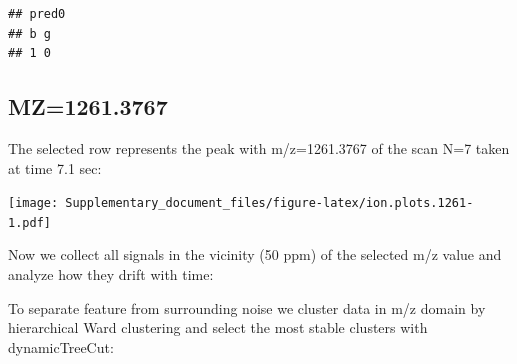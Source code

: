 \documentclass[]{article}
\newenvironment{Shaded}{\begin{snugshade}}{\end{snugshade}}
\newcommand{\KeywordTok}[1]{\textcolor[rgb]{0.13,0.29,0.53}{\textbf{#1}}}
\newcommand{\FloatTok}[1]{\textcolor[rgb]{0.00,0.00,0.81}{#1}}
\newcommand{\StringTok}[1]{\textcolor[rgb]{0.31,0.60,0.02}{#1}}
\newcommand{\OperatorTok}[1]{\textcolor[rgb]{0.81,0.36,0.00}{\textbf{#1}}}
\newcommand{\NormalTok}[1]{#1}
\begin{document}
\begin{verbatim}
## pred0
## b g 
## 1 0
\end{verbatim}

\subsection{MZ=1261.3767}\label{mz1261.3767}

\begin{Shaded}
\end{Shaded}

The selected row represents the peak with m/z=1261.3767 of the scan N=7
taken at time 7.1 sec:

\begin{Shaded}
\end{Shaded}

\texttt{[image: Supplementary\_document\_files/figure-latex/ion.plots.1261-1.pdf]}

Now we collect all signals in the vicinity (50 ppm) of the selected m/z
value and analyze how they drift with time:

\begin{Shaded}
\end{Shaded}

To separate feature from surrounding noise we cluster data in m/z domain
by hierarchical Ward clustering and select the most stable clusters with
dynamicTreeCut:
\end{document}
